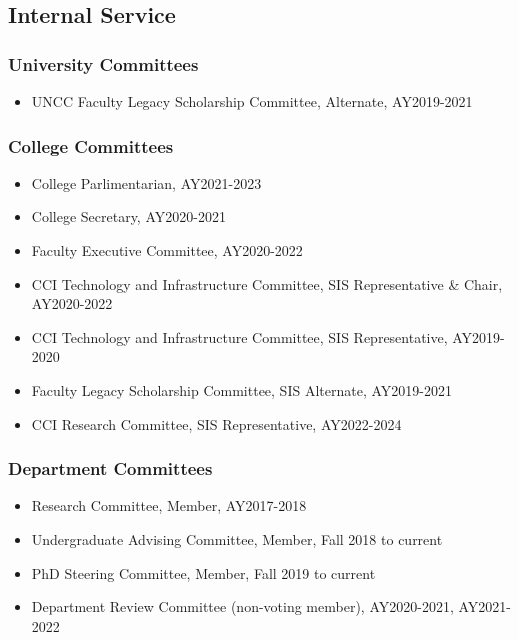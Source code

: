 
\hypertarget{internal-service}{%
\subsection{Internal Service}\label{internal-service}}

\hypertarget{university-committees}{%
\subsubsection{University Committees}\label{university-committees}}
\begin{itemize}
\item UNCC Faculty Legacy Scholarship Committee, Alternate, AY2019-2021
\end{itemize}

\hypertarget{college-committees}{%
\subsubsection{College Committees}\label{college-committees}}
\begin{itemize}
\item College Parlimentarian, AY2021-2023
\item College Secretary, AY2020-2021
\item Faculty Executive Committee, AY2020-2022
\item CCI Technology and Infrastructure Committee, SIS Representative \& Chair, AY2020-2022
\item CCI Technology and Infrastructure Committee, SIS Representative, AY2019-2020
\item Faculty Legacy Scholarship Committee, SIS Alternate, AY2019-2021
\item CCI Research Committee, SIS Representative, AY2022-2024
\end{itemize}

\hypertarget{dept-committees}{%
\subsubsection{Department Committees}\label{dept-committees}}
\begin{itemize}
\item Research Committee, Member, AY2017-2018
\item Undergraduate Advising Committee, Member, Fall 2018 to current
\item PhD Steering Committee, Member, Fall 2019 to current
\item Department Review Committee (non-voting member), AY2020-2021, AY2021-2022
\end{itemize}

